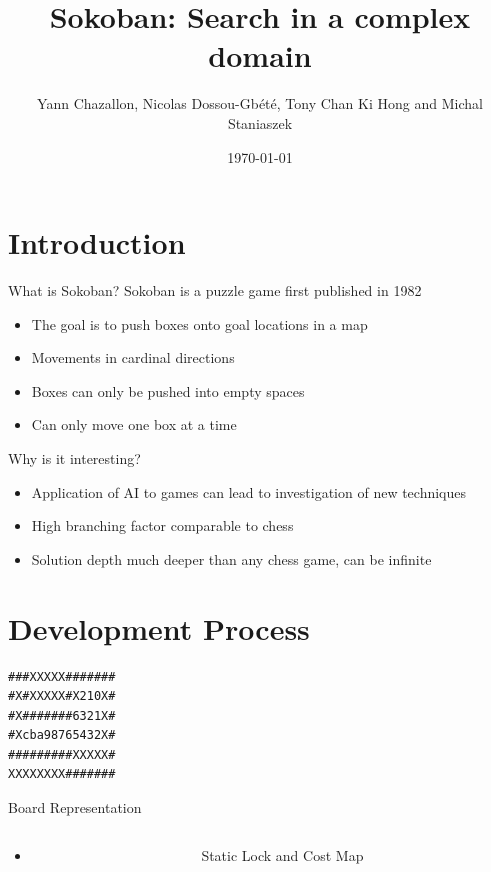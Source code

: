 \documentclass{beamer}
\title[Sokoban] %
{Sokoban: Search in a complex domain}
\author[Chazallon, Dossou-Gb{\'e}t{\'e}, Hong, Staniaszek]{Yann Chazallon,  Nicolas Dossou-Gb{\'e}t{\'e}, Tony Chan Ki Hong and Michal Staniaszek}
\date{\today}
\begin{document}
\begin{frame}
  \titlepage
\end{frame}

\section{Introduction}

\begin{frame}{What is Sokoban?}
  Sokoban is a puzzle game first published in 1982
  \begin{itemize}
    \item The goal is to push boxes onto goal locations in a map
    \item Movements in cardinal directions
    \item Boxes can only be pushed into empty spaces
    \item Can only move one box at a time
  \end{itemize}
\end{frame} 

\begin{frame}{Why is it interesting?}
  \begin{itemize}
  \item Application of AI to games can lead to investigation of new techniques
  \item High branching factor comparable to chess
  \item Solution depth much deeper than any chess game, can be infinite
  \end{itemize}
\end{frame}

\section{Development Process}


\begin{lrbox}{\mapstatic}
  \begin{minipage}{.25\textwidth}
\centering
\begin{BVerbatim}
###XXXXX#######
#X#XXXXX#X210X#
#X#######6321X#
#Xcba98765432X#
#########XXXXX#
XXXXXXXX#######
\end{BVerbatim}
  \end{minipage}
\end{lrbox}%


\begin{frame}{Board Representation}
  \begin{columns}
    \begin{column}{.5\textwidth}
      \begin{itemize}
        \item
      \end{itemize}
    \end{column}
    \begin{column}{.5\textwidth}
      \begin{block}{Static Lock and Cost Map}
        \centering
        \usebox{\mapstatic}
      \end{block}
    \end{column}
  \end{columns}
\end{frame}
\end{document}
